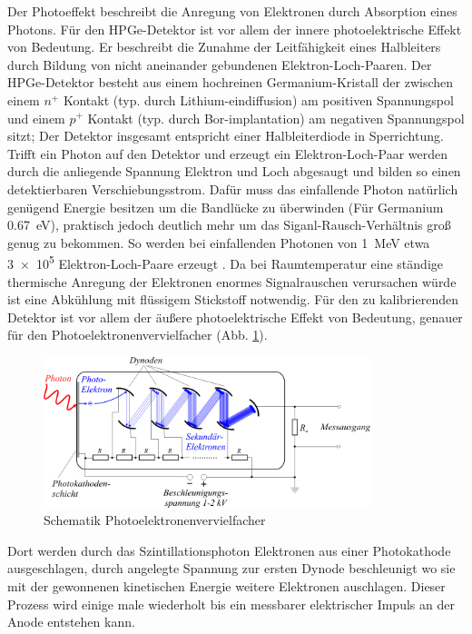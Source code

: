 Der Photoeffekt beschreibt die Anregung von Elektronen durch Absorption eines Photons.
Für den HPGe-Detektor ist vor allem der innere photoelektrische Effekt von Bedeutung. Er beschreibt die Zunahme der Leitfähigkeit eines Halbleiters durch Bildung von nicht aneinander gebundenen Elektron-Loch-Paaren. Der HPGe-Detektor besteht aus einem hochreinen Germanium-Kristall der zwischen einem $n^{+}$ Kontakt (typ. durch Lithium-eindiffusion) am positiven Spannungspol und einem $p^{+}$ Kontakt (typ. durch Bor-implantation) am negativen Spannungspol sitzt; Der Detektor insgesamt entspricht einer Halbleiterdiode in Sperrichtung. Trifft ein Photon auf den Detektor und erzeugt ein Elektron-Loch-Paar werden durch die anliegende Spannung Elektron und Loch abgesaugt und bilden so einen detektierbaren Verschiebungsstrom. Dafür muss das einfallende Photon natürlich genügend Energie besitzen um die Bandlücke zu überwinden (Für Germanium \SI{0.67}{\electronvolt}), praktisch jedoch deutlich mehr um das Siganl-Rausch-Verhältnis groß genug zu bekommen. So werden bei einfallenden Photonen von \SI{1}{\mega\electronvolt} etwa \num{3e5} Elektron-Loch-Paare erzeugt \cite{HPGe-Detektor}. Da bei Raumtemperatur eine ständige thermische Anregung der Elektronen enormes Signalrauschen verursachen würde ist eine Abkühlung mit flüssigem Stickstoff notwendig.
Für den zu kalibrierenden Detektor ist vor allem der äußere photoelektrische Effekt von Bedeutung, genauer für den Photoelektronenvervielfacher (Abb. \ref{theorie_PEV}).

\begin{figure}[ht]
	\centering
    \includegraphics[width=0.85\textwidth]{images/Photomultiplier_schema_de.png}
	\caption{Schematik Photoelektronenvervielfacher \cite{Bild_Photomultiplier}}
	\label{theorie_PEV}
\end{figure}

Dort werden durch das Szintillationsphoton Elektronen aus einer Photokathode ausgeschlagen, durch angelegte Spannung zur ersten Dynode beschleunigt wo sie mit der gewonnenen kinetischen Energie weitere Elektronen auschlagen. Dieser Prozess wird einige male wiederholt bis ein messbarer elektrischer Impuls an der Anode entstehen kann.

